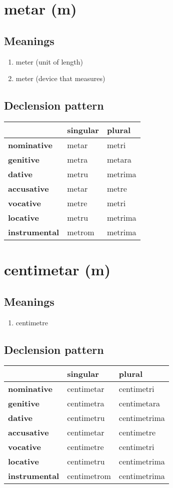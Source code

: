 \filbreak
\section{metar (m)}
\subsection*{Meanings}
\begin{enumerate}
\item meter (unit of length)
\item meter (device that measures)
\end{enumerate}
\subsection*{Declension pattern}
\begin{tabularx}{\linewidth}{Xll}
\toprule
{} & singular &   plural \\
\midrule
\textbf{nominative  } &    metar &    metri \\
\textbf{genitive    } &    metra &   metara \\
\textbf{dative      } &    metru &  metrima \\
\textbf{accusative  } &    metar &    metre \\
\textbf{vocative    } &    metre &    metri \\
\textbf{locative    } &    metru &  metrima \\
\textbf{instrumental} &   metrom &  metrima \\
\bottomrule
\end{tabularx}

\filbreak
\section{centimetar (m)}
\subsection*{Meanings}
\begin{enumerate}
\item centimetre
\end{enumerate}
\subsection*{Declension pattern}
\begin{tabularx}{\linewidth}{Xll}
\toprule
{} &     singular &        plural \\
\midrule
\textbf{nominative  } &   centimetar &    centimetri \\
\textbf{genitive    } &   centimetra &   centimetara \\
\textbf{dative      } &   centimetru &  centimetrima \\
\textbf{accusative  } &   centimetar &    centimetre \\
\textbf{vocative    } &   centimetre &    centimetri \\
\textbf{locative    } &   centimetru &  centimetrima \\
\textbf{instrumental} &  centimetrom &  centimetrima \\
\bottomrule
\end{tabularx}

